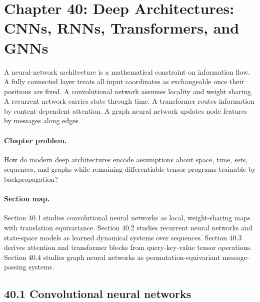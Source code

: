 \section{Chapter 40: Deep Architectures: CNNs, RNNs, Transformers, and GNNs}
\label{ch:deep-architectures}

A neural-network architecture is a mathematical constraint on information flow. A fully connected layer treats all input coordinates as exchangeable once their positions are fixed. A convolutional network assumes locality and weight sharing. A recurrent network carries state through time. A transformer routes information by content-dependent attention. A graph neural network updates node features by messages along edges.

\paragraph{Chapter problem.}
How do modern deep architectures encode assumptions about space, time, sets, sequences, and graphs while remaining differentiable tensor programs trainable by backpropagation?

\paragraph{Section map.}
Section 40.1 studies convolutional neural networks as local, weight-sharing maps with translation equivariance. Section 40.2 studies recurrent neural networks and state-space models as learned dynamical systems over sequences. Section 40.3 derives attention and transformer blocks from query-key-value tensor operations. Section 40.4 studies graph neural networks as permutation-equivariant message-passing systems.

\subsection{40.1 Convolutional neural networks}

